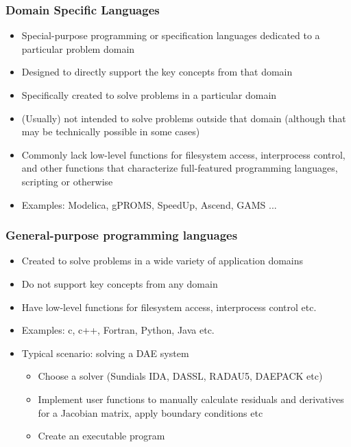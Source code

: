 \documentclass{beamer}
\begin{document}
\begin{frame}
\frametitle{Domain Specific Languages}
\begin{block}{}
\begin{itemize}
  \item Special-purpose programming or specification languages dedicated to a particular problem domain
  \item Designed to directly support the key concepts from that domain
  \item Specifically created to solve problems in a particular domain
  \item (Usually) not intended to solve problems outside that domain (although that may be technically possible in some cases)
  \item Commonly lack low-level functions for filesystem access, interprocess control, and other functions that characterize 
	full-featured programming languages, scripting or otherwise
  \item Examples: Modelica, gPROMS, SpeedUp, Ascend, GAMS ...
\end{itemize}
\end{block}
\end{frame}

\begin{frame}
\frametitle{General-purpose programming languages}
\begin{block}{}
\begin{itemize}
  \item Created to solve problems in a wide variety of application domains
  \item Do not support key concepts from any domain
  \item Have low-level functions for filesystem access, interprocess control etc.
  \item Examples: c, c++, Fortran, Python, Java etc.
  \item Typical scenario: solving a DAE system
  \begin{itemize}
    \item Choose a solver (Sundials IDA, DASSL, RADAU5, DAEPACK etc)
    \item Implement user functions to manually calculate residuals and derivatives for a Jacobian matrix, apply boundary conditions etc
    \item Create an executable program
  \end{itemize}
\end{itemize}
\end{block}
\end{frame}
\end{document}
